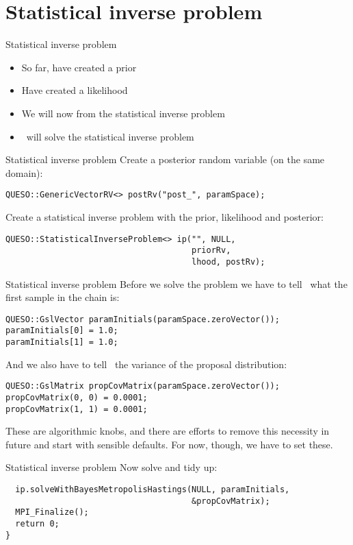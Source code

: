 \section{Statistical inverse problem}
\begin{frame}[fragile]{Statistical inverse problem}
  \begin{itemize}
    \item So far, have created a prior
    \item Have created a likelihood
    \item We will now from the statistical inverse problem
    \item \Queso\ will solve the statistical inverse problem
  \end{itemize}
\end{frame}

\begin{frame}[fragile]{Statistical inverse problem}
  Create a posterior random variable (on the same domain):
  \begin{verbatim}
QUESO::GenericVectorRV<> postRv("post_", paramSpace); \end{verbatim}
  Create a statistical inverse problem with the prior, likelihood and
  posterior:
  \begin{verbatim}
QUESO::StatisticalInverseProblem<> ip("", NULL,
                                      priorRv,
                                      lhood, postRv); \end{verbatim}
\end{frame}

\begin{frame}[fragile]{Statistical inverse problem}
  Before we solve the problem we have to tell \Queso\ what the first sample in
  the chain is:
  \begin{verbatim}
QUESO::GslVector paramInitials(paramSpace.zeroVector());
paramInitials[0] = 1.0;
paramInitials[1] = 1.0; \end{verbatim}
  And we also have to tell \Queso\ the variance of the proposal distribution:
  \begin{verbatim}
QUESO::GslMatrix propCovMatrix(paramSpace.zeroVector());
propCovMatrix(0, 0) = 0.0001;
propCovMatrix(1, 1) = 0.0001; \end{verbatim}
  These are algorithmic knobs, and there are efforts to remove this necessity
  in future and start with sensible defaults.  For now, though, we have to set
  these.
\end{frame}

\begin{frame}[fragile]{Statistical inverse problem}
  Now solve and tidy up:
  \begin{verbatim}
  ip.solveWithBayesMetropolisHastings(NULL, paramInitials,
                                      &propCovMatrix);
  MPI_Finalize();
  return 0;
} \end{verbatim}
\end{frame}

